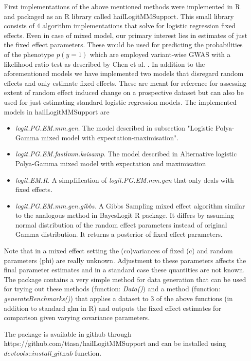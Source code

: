 \documentclass [12pt,a4paper]{report}
\begin{document}
First implementations of the above mentioned methods were implemented in R and packaged as an R library called hailLogitMMSupport. This small library consists of 4 algorithm implementations that solve for logistic regression fixed effects. Even in case of mixed model, our primary interest lies in estimates of just the fixed effect parameters. These would be used for predicting the probabilities of the phenotype $p(y=1)$ which are employed variant-wise GWAS with a likelihood ratio test as described by Chen et al. \cite{chen_control_2016}. In addition to the aforementioned models we have implemented two models that disregard random effects and only estimate fixed effects. These are meant for reference for assessing extent of random effect induced change on a prospective dataset but can also be used for just estimating standard logistic regression models.
The implemented models in hailLogitMMSupport are
\begin{itemize}
 \item \textit{logit.PG.EM.mm.gen}. The model described in subsection "Logistic Polya-Gamma mixed model with expectation-maximisation".
 \item \textit{logit.PG.EM.fastlmm.ksisamp}. The model described in  Alternative logistic Polya-Gamma mixed model with expectation and maximisation
 \item \textit{logit.EM.R}. A simplification of \textit{logit.PG.EM.mm.gen} that only deals with fixed effects.
 \item \textit{logit.PG.EM.mm.gen.gibbs}. A Gibbs Sampling mixed effect algorithm similar to the analogous method in BayesLogit R package. It differs by assuming normal distribution of the random effect parameters instead of original Gamma distribution. It returns a posterior of fixed effect parameters.      
\end{itemize}

Note that in a mixed effect setting the (co)variances of fixed (c) and random parameters (phi)  are really unknown. Adjustment to these parameters affects the final parameter estimates and in a standard case these quantities are not known. The package contains a very simple method for data generation that can be used for trying out these methods (function: \textit{Data()}) and a method (function: \textit{generateBenchmarks()}) that applies a dataset to 3 of the above functions (in addition to standard glm in R) and outputs the fixed effect estimates for comparison given varying covariance parameters.\par 
The package is available in github through https://github.com/ttasa/hailLogitMMSupport and can be installed using $\textit{devtools::install\_github}$ function.



\end{document}
